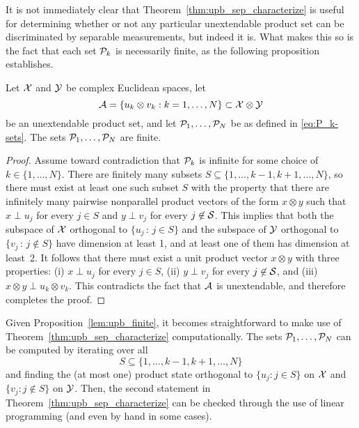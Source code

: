 It is not immediately clear that Theorem~\ref{thm:upb_sep_characterize} is
useful for determining whether or not any particular unextendable product set
can be discriminated by separable measurements, but indeed it is.
What makes this so is the fact that each set $\P_k$ is necessarily finite, as
the following proposition establishes.

\begin{prop}\label{lem:upb_finite}
  Let $\X$ and $\Y$ be complex Euclidean spaces, let
  \[
    \A = \{ u_{k}\otimes v_{k} : k = 1, \ldots, N \} \subset \X\otimes\Y
  \]
  be an unextendable product set, and let $\P_1,\ldots,\P_N$ be as defined in
  \eqref{eq:P_k-sets}.
  The sets $\P_1,\ldots,\P_N$ are finite.
\end{prop}

\begin{proof}
  Assume toward contradiction that $\P_k$ is infinite for some choice of
  $k\in\{1,\ldots,N\}$.
  There are finitely many subsets $S\subseteq \{1,\ldots,k-1,k+1,\ldots,N\}$,
  so  there must exist at least one such subset $S$ with the property that
  there are infinitely many pairwise nonparallel product vectors of the form
  $x\otimes y$ such that $x \perp u_j$ for every $j\in S$ and $y\perp v_j$ for
  every $j\not\in\S$.
  This implies that both the subspace of $\X$ orthogonal to
  $\{u_j\,:\,j\in S\}$ and the subspace of $\Y$ orthogonal to
  $\{v_j\,:\,j\not\in S\}$ have dimension at least 1, and
  at least one of them has dimension at least~2.
  It follows that there must exist a unit product vector $x \otimes y$ with
  three properties:
  (i) $x \perp u_j$ for every $j\in S$,
  (ii) $y \perp v_j$ for every $j\not\in\S$, and
  (iii) $x\otimes y\perp u_k \otimes v_k$.
  This contradicts the fact that $\A$ is unextendable, and therefore completes
  the proof.
\end{proof}

Given Proposition~\ref{lem:upb_finite}, it becomes straightforward to make use
of Theorem~\ref{thm:upb_sep_characterize} computationally.
The sets $\P_1,\ldots,\P_N$ can be computed by iterating over all 
\[
  S \subseteq \{1,\ldots,k-1,k+1,\ldots,N\}
\] 
and finding the (at most one) product state orthogonal to $\{ u_j : j \in S \}$ on
$\X$ and $\{ v_j : j \notin S \}$ on $\Y$. 
Then, the second statement in Theorem~\ref{thm:upb_sep_characterize} can be
checked through the use of linear programming (and even by hand in some cases).

